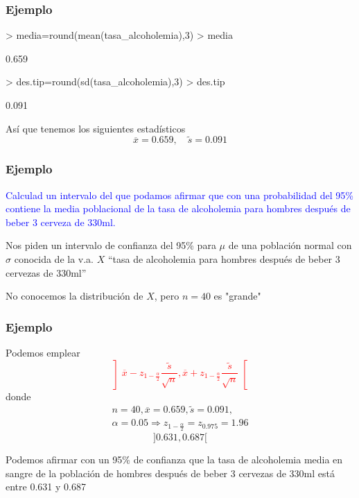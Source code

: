 \documentclass[12pt,t]{beamer}
\newcommand{\red}[1]{\textcolor{red}{#1}}
\newcommand{\blue}[1]{\textcolor{blue}{#1}}
\renewcommand{\emph}[1]{{\color{red}#1}}
\theoremstyle{plain}
\theoremstyle{definition}
\begin{document}
\begin{frame}[fragile]
\frametitle{Ejemplo}
\vspace*{-2ex}

\begin{Schunk}
\begin{Sinput}
> media=round(mean(tasa_alcoholemia),3)
> media
\end{Sinput}
\begin{Soutput}
[1] 0.659
\end{Soutput}
\begin{Sinput}
> des.tip=round(sd(tasa_alcoholemia),3)
> des.tip
\end{Sinput}
\begin{Soutput}
[1] 0.091
\end{Soutput}
\end{Schunk}
Así que tenemos los siguientes estadísticos
$$
\overline{x}=0.659,\quad \widetilde{s}=0.091
$$


\end{frame}


\begin{frame}
\frametitle{Ejemplo}
\blue{Calculad  un intervalo del que podamos afirmar que con una probabilidad del 95\% contiene la media poblacional de  la tasa de alcoholemia  para hombres después de beber 3 cerveza de 330ml.}
\medskip

Nos piden un \emph{intervalo de confianza  del 95\%}  para $\mu$ de una población normal con $\sigma$ conocida  de la v.a. $X$ ``tasa de alcoholemia  para hombres después de beber 3 cervezas de 330ml''

No conocemos la distribución de  $X$, pero $n=40$ es "grande"
\end{frame}

\begin{frame}
\frametitle{Ejemplo}
Podemos emplear
\red{$$
\left]\overline{x}-z_{1-\frac{\alpha}{2}}\frac{\widetilde{s}}{\sqrt{n}},
    \overline{x}+z_{1-\frac{\alpha}{2}}\frac{\widetilde{s}}{\sqrt{n}}\right[
$$}
donde
$$
\begin{array}{c}
n=40,\overline{x}=0.659,\widetilde{s}=0.091,\\[1ex]
\alpha=0.05\Rightarrow z_{1-\frac{\alpha}{2}}=z_{0.975}=1.96
\end{array}
$$
$$
]0.631, 0.687[
$$

Podemos afirmar con un 95\% de confianza  que la tasa de alcoholemia media en sangre de la población de hombres después de  beber  3  cervezas de 330ml está entre 
0.631 y 
0.687

\end{frame}
\end{document}
